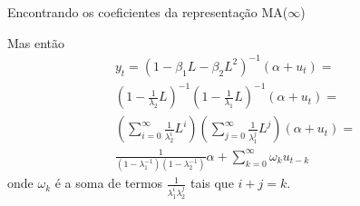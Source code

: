 \documentclass[11pt]{beamer}
\newenvironment{halfwideitemize}{\itemize\addtolength{\itemsep}{0.5em}}{\enditemize}
\begin{document}
\begin{frame}{Encontrando os coeficientes da representação MA($\infty$)}
	\begin{halfwideitemize}
		\item Mas então 
		\begin{equation}
			\begin{aligned}
				y_t = (1-\beta_1 L - \beta_2 L^2)^{-1}(\alpha + u_t) = \\ \left(1-\frac{1}{\lambda_2}L\right)^{-1}\left(1- \frac{1}{\lambda_1}L\right)^{-1}(\alpha+u_t) = \\
				 \left(\sum_{i=0}^\infty \frac{1}{\lambda_2^i} L^i\right) \left(\sum_{j=0}^\infty \frac{1}{\lambda_1^j}L^j\right)(\alpha + u_t) =\\
				 \frac{1}{(1-\lambda_1^{-1})(1-\lambda_2^{-1})}\alpha + \sum_{k=0}^\infty \omega_k u_{t-k} \end{aligned}
		\end{equation}
		onde $\omega_k$ é a soma de termos $\frac{1}{\lambda^i_1 \lambda^j_2}$ tais que $i+j=k$. 
	\end{halfwideitemize}
\end{frame}

\end{document}
